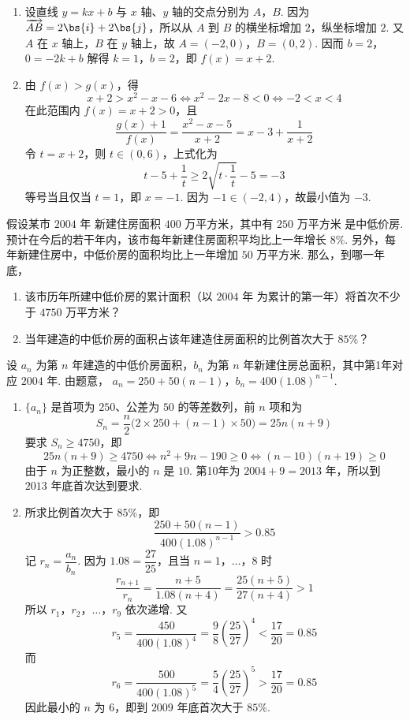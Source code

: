\begin{solution}
\begin{enumerate}
\item 设直线 \(y=kx+b\) 与 \(x\) 轴、\(y\) 轴的交点分别为 \(A\)，\(B\). 因为 \(\overrightarrow{AB}=2\bs{i}+2\bs{j}\)，所以从 \(A\) 到 \(B\) 的横坐标增加 \(2\)，纵坐标增加 \(2\). 又 \(A\) 在 \(x\) 轴上，\(B\) 在 \(y\) 轴上，故 \(A=(-2,0)\)，\(B=(0,2)\). 因而
\(b=2\)，\(0=-2k+b\)
解得 \(k=1\)，\(b=2\)，即 \(f(x)=x+2\).

\item 由 \(f(x)>g(x)\)，得
\[
x+2>x^2-x-6\iff x^2-2x-8<0\iff -2<x<4
\]
在此范围内 \(f(x)=x+2>0\)，且
\[
\frac{g(x)+1}{f(x)}=\frac{x^2-x-5}{x+2}=x-3+\frac1{x+2}
\]
令 \(t=x+2\)，则 \(t\in(0,6)\)，上式化为
\[
t-5+\frac1t\geqslant2\sqrt{t\cdot\frac1t}-5=-3
\]
等号当且仅当 \(t=1\)，即 \(x=-1\). 因为 \(-1\in(-2,4)\)，故最小值为 \(-3\).
\end{enumerate}
\end{solution}

\begin{problem}
假设某市 \(2004\text{ 年}\) 新建住房面积 \(400\text{ 万平方米}\)，其中有 \(250\text{ 万平方米}\) 是中低价房. 预计在今后的若干年内，该市每年新建住房面积平均比上一年增长 \(8\%\). 另外，每年新建住房中，中低价房的面积均比上一年增加 \(50\text{ 万平方米}\). 那么，到哪一年底，

\begin{enumerate}
\item 该市历年所建中低价房的累计面积（以 \(2004\text{ 年}\) 为累计的第一年）将首次不少于 \(4750\text{ 万平方米}\)？
\item 当年建造的中低价房的面积占该年建造住房面积的比例首次大于 \(85\%\)？
\end{enumerate}
\end{problem}

\begin{solution}
设 \(a_n\) 为第 \(n\) 年建造的中低价房面积，\(b_n\) 为第 \(n\) 年新建住房总面积，其中第1年对应 \(2004\) 年. 由题意，
\(a_n=250+50(n-1)\)，\(b_n=400(1.08)^{n-1}\).

\begin{enumerate}
\item \(\{a_n\}\) 是首项为 \(250\)、公差为 \(50\) 的等差数列，前 \(n\) 项和为
\[
S_n=\frac{n}{2}\bigl(2\times250+(n-1)\times50\bigr)=25n(n+9)
\]
要求 \(S_n\geqslant4750\)，即
\[
25n(n+9)\geqslant4750\iff n^2+9n-190\geqslant0\iff(n-10)(n+19)\geqslant0
\]
由于 \(n\) 为正整数，最小的 \(n\) 是 \(10\). 第10年为 \(2004+9=2013\) 年，所以到 \(2013\) 年底首次达到要求.

\item 所求比例首次大于 \(85\%\)，即
\[
\frac{250+50(n-1)}{400(1.08)^{n-1}}>0.85
\]
记 \(r_n=\dfrac{a_n}{b_n}\). 因为 \(1.08=\dfrac{27}{25}\)，且当 \(n=1\)，\(\dots\)，\(8\) 时
\[
\frac{r_{n+1}}{r_n}=\frac{n+5}{1.08(n+4)}=\frac{25(n+5)}{27(n+4)}>1
\]
所以 \(r_1\)，\(r_2\)，\(\dots\)，\(r_9\) 依次递增. 又
\[
r_5=\frac{450}{400(1.08)^4}=\frac98\left(\frac{25}{27}\right)^4<\frac{17}{20}=0.85
\]
而
\[
r_6=\frac{500}{400(1.08)^5}=\frac54\left(\frac{25}{27}\right)^5>\frac{17}{20}=0.85
\]
因此最小的 \(n\) 为 \(6\)，即到 \(2009\) 年底首次大于 \(85\%\).
\end{enumerate}
\end{solution}

